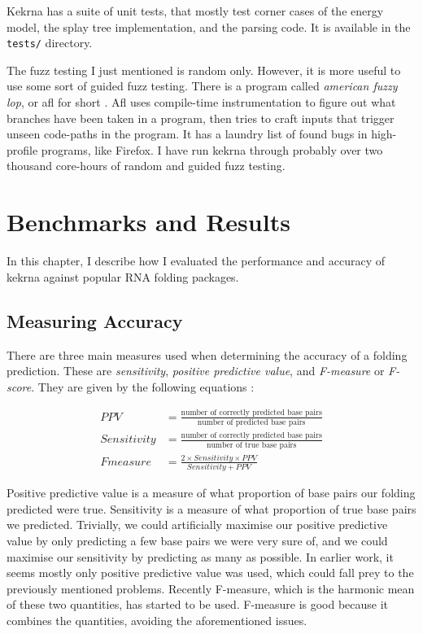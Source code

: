 \documentclass{cshonours}
\begin{document}
Kekrna has a suite of unit tests, that mostly test corner cases of the energy model, the splay tree implementation, and the parsing code. It is available in the \texttt{tests/} directory. 

The fuzz testing I just mentioned is random only. However, it is more useful to use some sort of guided fuzz testing. There is a program called \emph{american fuzzy lop}, or afl for short \cite{afl}. Afl uses compile-time instrumentation to figure out what branches have been taken in a program, then tries to craft inputs that trigger unseen code-paths in the program. It has a laundry list of found bugs in high-profile programs, like Firefox. I have run kekrna through probably over two thousand core-hours of random and guided fuzz testing.

\chapter{Benchmarks and Results}
\label{chap:results}

In this chapter, I describe how I evaluated the performance and accuracy of kekrna against popular RNA folding packages.

\section{Measuring Accuracy}
There are three main measures used when determining the accuracy of a folding prediction. These are \emph{sensitivity}, \emph{positive predictive value}, and \emph{F-measure} or \emph{F-score}. They are given by the following equations \cite{andronescuModel}:

\begin{align*}
PPV &= \frac{\text{number of correctly predicted base pairs}}{\text{number of predicted base pairs}} \\
Sensitivity &= \frac{\text{number of correctly predicted base pairs}}{\text{number of true base pairs}}\\
Fmeasure &= \frac{2\times Sensitivity \times PPV}{Sensitivity + PPV}
\end{align*}

Positive predictive value is a measure of what proportion of base pairs our folding predicted were true. Sensitivity is a measure of what proportion of true base pairs we predicted. Trivially, we could artificially maximise our positive predictive value by only predicting a few base pairs we were very sure of, and we could maximise our sensitivity by predicting as many as possible. In earlier work, it seems mostly only positive predictive value was used, which could fall prey to the previously mentioned problems. Recently F-measure, which is the harmonic mean of these two quantities, has started to be used. F-measure is good because it combines the quantities, avoiding the aforementioned issues.
\end{document}
